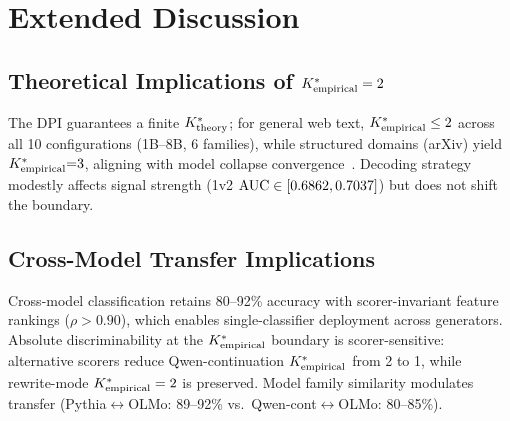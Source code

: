 \section{Extended Discussion}
\label{sec:extended_discussion}

\subsection{Theoretical Implications of $\Kempirical = 2$}

The DPI guarantees a finite ${K^*_{\text{theory}}}$; for general web text, ${K^*_{\text{empirical}}} \leq 2$ across all 10 configurations (1B--8B, 6 families), while structured domains (arXiv) yield ${K^*_{\text{empirical}}}{=}3$, aligning with model collapse convergence~\cite{shumailov2024collapse, dohmatob2024model, alemohammad2024selfconsuming}.
Decoding strategy modestly affects signal strength (1v2 $\text{AUC} \in [0.6862, 0.7037]$) but does not shift the boundary.

\subsection{Cross-Model Transfer Implications}

Cross-model classification retains 80--92\% accuracy with scorer-invariant feature rankings ($\rho > 0.90$), which enables single-classifier deployment across generators.
Absolute discriminability at the $\Kempirical$ boundary is scorer-sensitive: alternative scorers reduce Qwen-continuation $\Kempirical$ from 2 to 1, while rewrite-mode $\Kempirical = 2$ is preserved.
Model family similarity modulates transfer (Pythia$\leftrightarrow$OLMo: 89--92\% vs.\ Qwen-cont$\leftrightarrow$OLMo: 80--85\%).

\begin{table}[h]
\centering
\caption{Cross-scorer validation. Alternative scorers (Pythia-1.4B, OLMo-1B) preserve feature ranking ($\rho > 0.90$) and rewrite-mode $\Kempirical = 2$, but reduce continuation-mode $\Kempirical$ from 2 to 1. OLMo arXiv cross-scorer confirms $\Kempirical{=}1$ ($p{=}0.510$, n.s.).}
\label{tab:crossscorer}
\resizebox{\columnwidth}{!}{}
\end{table}

